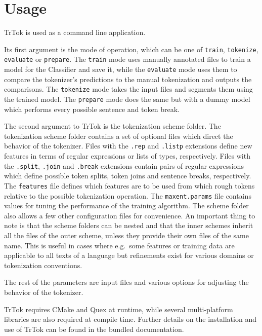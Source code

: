 \section{Usage}
\label{sec:usage}

TrTok is used as a command line application.

Its first argument is the mode of operation, which can be one of
\texttt{train}, \texttt{tokenize}, \texttt{evaluate} or
\texttt{prepare}. The \texttt{train} mode uses manually annotated
files to train a model for the Classifier and save it, while the
\texttt{evaluate} mode uses them to compare the tokenizer's
predictions to the manual tokenization and outputs the comparisons.
The \texttt{tokenize} mode takes the input files and segments them
using the trained model. The \texttt{prepare} mode does the same but
with a dummy model which performs every possible sentence and token
break.

The second argument to TrTok is the tokenization scheme folder. The
tokenization scheme folder contains a set of optional files which
direct the behavior of the tokenizer. Files with the \texttt{.rep} and
\texttt{.listp} extensions define new features in terms of regular
expressions or lists of types, respectively. Files with the
\texttt{.split}, \texttt{.join} and \texttt{.break} extensions contain
pairs of regular expressions which define possible token splits, token
joins and sentence breaks, respectively. The \texttt{features} file
defines which features are to be used from which rough tokens relative
to the possible tokenization operation. The \texttt{maxent.params}
file contains values for tuning the performance of the training
algorithm. The scheme folder also allows a few other configuration
files for convenience. An important thing to note is that the scheme
folders can be nested and that the inner schemes inherit all the files
of the outer scheme, unless they provide their own files of the same
name. This is useful in cases where e.g.\ some features or training
data are applicable to all texts of a language but refinements exist
for various domains or tokenization conventions.

The rest of the parameters are input files and various options for
adjusting the behavior of the tokenizer.

TrTok requires CMake and Quex at runtime, while several multi-platform
libraries are also required at compile time. Further details on the
installation and use of TrTok can be found in the bundled
documentation.
